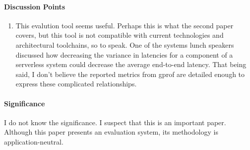 \paragraph{\textbf{Discussion Points}}
\begin{enumerate}
    \item This evalution tool seems useful. Perhaps this is what the second
    paper covers, but this tool is not compatible with current technologies and
    architectural toolchains, so to speak. One of the systems lunch speakers
    discussed how decreasing the variance in latencies for a component of a
    serverless system could decrease the average end-to-end latency. That being
    said, I don't believe the reported metrics from gprof are detailed enough to
    express these complicated relationships.
\end{enumerate}

\paragraph{\textbf{Significance}}
I do not know the significance. I suspect that this is an important paper.
Although this paper presents an evaluation system, its methodology is
application-neutral.
